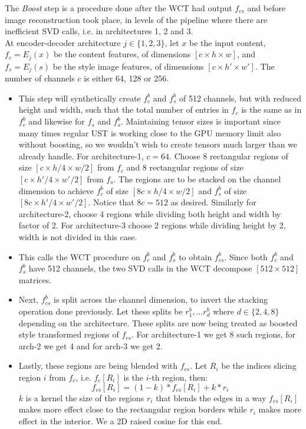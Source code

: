 The \textit{Boost} step is a procedure done after the WCT had output $f_{cs}$ and before image reconstruction took place, in levels of the pipeline where there are inefficient SVD calls, i.e. in architectures 1, 2 and 3.\\
At encoder-decoder architecture $j\in\{1,2,3\}$, let $x$ be the input content, $f_c = E_j(x)$ be the content features, of dimensions $[c \times h \times w]$, and $f_s = E_j(s)$ be the style image features, of dimensions $[c \times h' \times w']$. The number of channels $c$ is either 64, 128 or 256.
\begin{itemize}
	\item This step will synthetically create $f_c^b$ and $f_s^b$ of 512 channels, but with reduced height and width, such that the total number of entries in $f_c$ is the same as in $f_c^b$ and likewise for $f_s$ and $f_s^b$. Maintaining tensor sizes is important since many times regular UST is working close to the GPU memory limit also without boosting, so we wouldn't wish to create tensors much larger than we already handle. For architecture-1, $c=64$. Choose 8 rectangular regions of size $[c \times h/4 \times w/2]$ from $f_c$ and 8 rectangular regions of size $[c \times h'/4 \times w'/2]$ from $f_s$. The regions are to be stacked on the channel dimension to achieve $f_c^b$ of size $[8c \times h/4 \times w/2]$ and $f_s^b$ of size $[8c \times h'/4 \times w'/2]$. Notice that $8c=512$ as desired. Similarly for architecture-2, choose 4 regions while dividing both height and width by factor of 2. For architecture-3 choose 2 regions while dividing height by 2, width is not divided in this case. 
	
	\item This calls the WCT procedure on $f_c^b$ and $f_s^b$ to obtain $f_{cs}^b$. Since both $f_c^b$ and $f_s^b$ have 512 channels, the two SVD calls in the WCT decompose $[512\times 512]$ matrices.
	
	\item Next, $f_{cs}^b$ is split across the channel dimension, to invert the stacking operation done previously. Let these splits be $r_1^b, \dots r_d^b$ where $d\in\{2,4,8\}$ depending on the architecture. These splits are now being treated as boosted style transformed regions of $f_{cs}$. For architecture-1 we get 8 such regions, for arch-2 we get 4 and for arch-3 we get 2.
	
	\item Lastly, these regions are being blended with $f_{cs}$. Let $R_i$ be the indices slicing region $i$ from $f_c$, i.e. $f_c[R_i]$ is the $i$-th region, then:
	\begin{equation}
	f_{cs}[R_i] = (1-k)*f_{cs}[R_i] + k*r_i
	\end{equation}
	$k$ is a kernel the size of the regions $r_i$ that blends the edges in a way $f_{cs}[R_i]$ makes more effect close to the rectangular region borders while $r_i$ makes more effect in the interior. We a 2D raised cosine for this end. 
\end{itemize}

